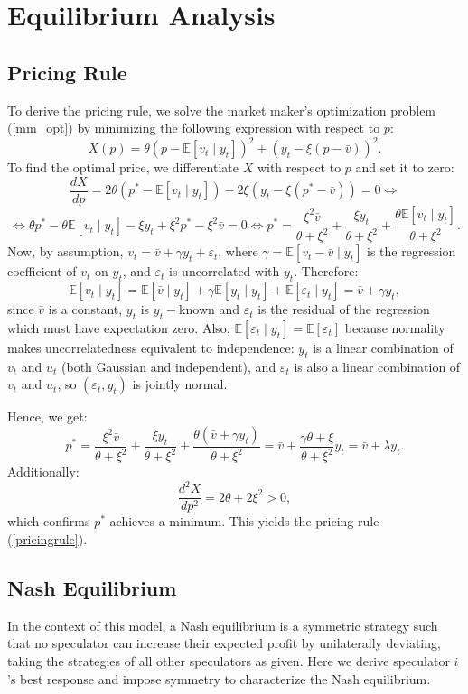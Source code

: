 \documentclass[11pt]{article}
\begin{document}
\section{Equilibrium Analysis}
\subsection{Pricing Rule}
To derive the pricing rule, we solve the market maker's optimization problem (\ref{mm_opt}) by minimizing the following expression with respect to $p$:
\[
X(p)=\theta(p-\mathbb{E}[v_t\mid y_t])^2+(y_t-\xi(p-\bar{v}))^2.
\]
To find the optimal price, we differentiate $X$ with respect to $p$ and set it to zero:
\[
\frac{dX}{dp}=2\theta(p^*-\mathbb{E}[v_t\mid y_t])-2\xi(y_t-\xi(p^*-\bar{v}))=0\iff
\]
\[
\iff \theta p^*-\theta\mathbb{E}[v_t\mid y_t]-\xi y_t+\xi^2p^*-\xi^2\bar{v}=0\iff p^*=\frac{\xi^2 \bar{v}}{\theta + \xi^2}+\frac{\xi y_t}{\theta + \xi^2}+\frac{\theta \mathbb{E}[v_t\mid y_t]}{\theta + \xi^2}.
\]
Now, by assumption, $v_t=\bar{v}+\gamma y_t+\varepsilon_t$, where $\gamma=\mathbb{E}[v_t-\bar{v}\mid y_t]$ is the regression coefficient of $v_t$ on $y_t$, and $\varepsilon_t$ is uncorrelated with $y_t$. Therefore:
\[
\mathbb{E}[v_t\mid y_t]=\mathbb{E}[\bar{v}\mid y_t]+\gamma \mathbb{E}[y_t\mid y_t]+\mathbb{E}[\varepsilon_t\mid y_t]=\bar{v}+\gamma y_t,
\]
since $\bar{v}$ is a constant, $y_t$ is $y_t-$known and $\varepsilon_t$ is the residual of the regression which must have expectation zero. Also, $\mathbb{E}[\varepsilon_t\mid y_t]=\mathbb{E}[\varepsilon_t]$ because normality makes uncorrelatedness equivalent to independence: $y_t$ is a linear combination of $v_t$ and $u_t$ (both Gaussian and independent), and $\varepsilon_t$ is also a linear combination of $v_t$ and $u_t$, so $(\varepsilon_t,y_t)$ is jointly normal.

Hence, we get:
\[
p^*=\frac{\xi^2 \bar{v}}{\theta + \xi^2}+\frac{\xi y_t}{\theta + \xi^2}+\frac{\theta (\bar{v}+\gamma y_t)}{\theta + \xi^2}=\bar{v}+\frac{\gamma \theta+\xi}{\theta+\xi^2}y_t=\bar{v}+\lambda y_t.
\]
Additionally:
\[
\frac{d^2X}{dp^2}=2\theta+2\xi^2>0,
\]
which confirms $p^*$ achieves a minimum. This yields the pricing rule (\ref{pricingrule}).


\subsection{Nash Equilibrium}
In the context of this model, a Nash equilibrium is a symmetric strategy such that no 
speculator can increase their expected profit by unilaterally deviating, taking the 
strategies of all other speculators as given. Here we derive speculator 
$i$'s best response and impose symmetry to characterize the Nash equilibrium.
\end{document}
